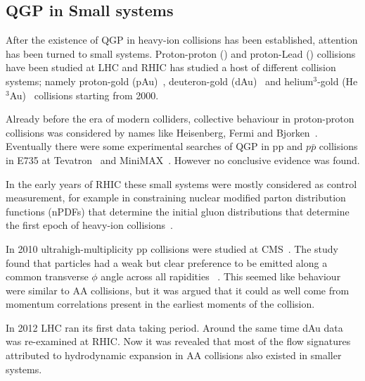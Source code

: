 
\subsection{QGP in Small systems}
\label{sec:smallsystem}
After the existence of QGP in heavy-ion collisions has been established, attention has been turned to small systems. Proton-proton (\pp) and proton-Lead (\pPb) collisions have been studied at LHC and RHIC has studied a host of different collision systems; namely proton-gold (pAu)~\cite{Aidala:2016vgl}, deuteron-gold (dAu)~\cite{Adler:2003ii,Arsene:2003yk,Back:2003ns,Adams:2003im} and helium$^3$-gold (He$^3$Au)~\cite{Adare:2015ctn} collisions starting from 2000. %

Already before the era of modern colliders, collective behaviour in proton-proton collisions was considered by names like Heisenberg, Fermi and Bjorken~\cite{Nagle:2018nvi}. Eventually there were some experimental searches of QGP in pp and $p\bar p$ collisions in E735 at Tevatron~\cite{Alexopoulos:1993wt} and MiniMAX~\cite{Brooks:1999xy}. However no conclusive evidence was found. 

In the early years of RHIC these small systems were mostly considered as control measurement, for example in constraining nuclear modified parton distribution functions (nPDFs) that determine the initial gluon distributions that determine the first epoch of heavy-ion collisions~\cite{Shen:2015qta, Adare:2015lcd}. 

In 2010 ultrahigh-multiplicity pp collisions were studied at CMS~\cite{Khachatryan:2010gv}. The study found that particles had a weak but clear preference to be emitted along a common transverse $\phi$ angle across all rapidities ~\cite{Salgado:2016jws}. This seemed like behaviour were similar to AA collisions, but it was argued that it could as well come from momentum correlations present in the earliest moments of the collision.

In 2012 LHC ran its first \pPb data taking period. Around the same time dAu data was re-examined at RHIC. Now it was revealed that most of the flow signatures attributed to hydrodynamic expansion in AA collisions also existed in smaller systems.



